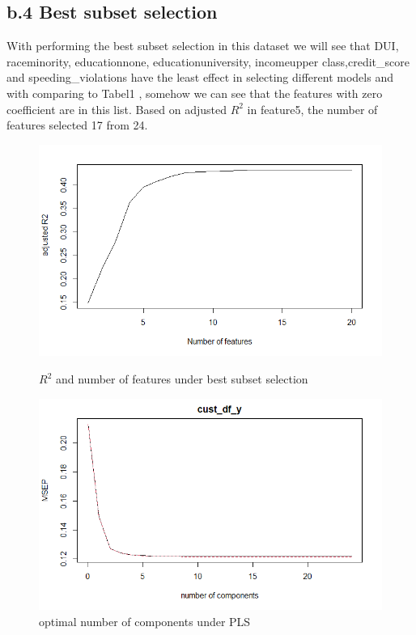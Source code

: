 \documentclass[a4paper, 11pt]{article}
\begin{document}
\subsection*{b.4 Best subset selection }
With performing the best subset selection in this dataset we will see that DUI, raceminority, educationnone, educationuniversity, incomeupper class,credit\_score and speeding\_violations have the least effect in selecting different models and with comparing to Tabel1 , somehow we can see that the features with zero coefficient are in this list. Based on adjusted $R^2$ in feature5, the number of features selected 17 from 24.

\begin{figure}[H]
	\centering
	\begin{minipage}[b]{0.4\textwidth}
		\includegraphics[width=\textwidth]{figure5.png}
		\caption{$R^2$ and number of features under best subset selection }
	\end{minipage}
	\begin{minipage}[b]{0.4\textwidth}
		\includegraphics[width=\textwidth]{figure6.png}
		\caption{ optimal number of components under PLS }
	\end{minipage}
\end{figure}
\end{document}
